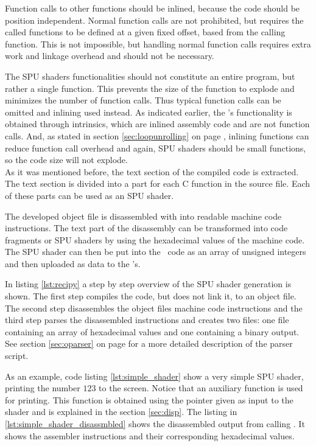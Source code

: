 Function calls to other functions should be inlined, because the code
should be position independent. Normal function calls are not
prohibited, but requires the called functions to be defined at a given
fixed offset, based from the calling function. This is not impossible,
but handling normal function calls requires extra work and linkage
overhead and should not be necessary.

The SPU shaders functionalities should not constitute an entire
program, but rather a single function. This prevents the size of the
function to explode and minimizes the number of function calls. Thus
typical function calls can be omitted and inlining used instead. As
indicated earlier, the \SPU{}'s functionality is obtained through
intrinsics, which are inlined assembly code and are not function
calls. And, as stated in section \ref{sec:loopunrolling} on
page \pageref{sec:loopunrolling}, inlining functions can reduce
function call overhead and again, SPU shaders should be small
functions, so the code size will not explode. \\

As it was mentioned before, the text section of the compiled code is
extracted. The text section is divided into a part for each C function
in the source file. Each of these parts can be used as an SPU shader.


The developed object file is disassembled with 
into readable machine code instructions. The text part of the
disassembly can be transformed into code fragments or SPU shaders by
using the hexadecimal values of the machine code. The SPU shader can
then be put into the \PPE\ code as an array of unsigned integers and
then uploaded as data to the \SPE{}'s.

In listing \ref{lst:recipy} a step by step overview of the SPU shader
generation is shown. The first step compiles the code, but does not
link it, to an object file. The second step disassembles the object
files machine code instructions and the third step parses the
disassembled instructions and creates two files: one file containing
an array of hexadecimal values and one containing a binary output. See
section \ref{sec:oparser} on page \pageref{sec:oparser} for a more
detailed description of the parser script.

As an example, code listing \ref{lst:simple_shader} show a very simple
SPU shader, printing the number $123$ to the screen. Notice that an
auxiliary function is used for printing. This function is obtained using
the  pointer given as input to the shader and is
explained in the section \ref{sec:disp}. The listing
in \ref{lst:simple_shader_disassmbled} shows the disassembled output
from calling . It shows the assembler
instructions and their corresponding hexadecimal values.

